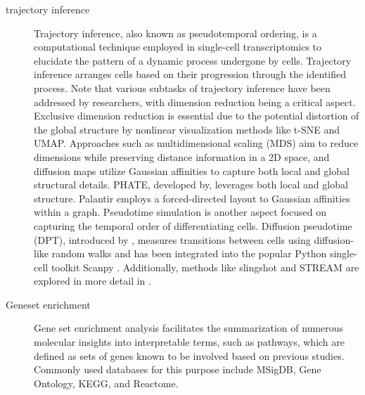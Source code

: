 \begin{description}
	\item[trajectory inference] 
	Trajectory inference, also known as pseudotemporal ordering, is a computational technique employed in single-cell transcriptomics to elucidate the pattern of a dynamic process undergone by cells. Trajectory inference arranges cells based on their progression through the identified process. Note that various subtasks of trajectory inference have been addressed by researchers, with dimension reduction being a critical aspect. Exclusive dimension reduction is essential due to the potential distortion of the global structure by nonlinear visualization methods like t-SNE and UMAP. Approaches such as multidimensional scaling (MDS) aim to reduce dimensions while preserving distance information in a 2D space, and diffusion maps utilize Gaussian affinities to capture both local and global structural details. PHATE, developed by\citep{moon2017phate}, leverages both local and global structure. Palantir employs a forced-directed layout to Gaussian affinities within a graph. Pseudotime simulation is another aspect focused on capturing the temporal order of differentiating cells. Diffusion pseudotime (DPT), introduced by \citep{haghverdi2016dpt}, measures transitions between cells using diffusion-like random walks and has been integrated into the popular Python single-cell toolkit Scanpy \citep{wolf2018scanpy}. Additionally, methods like slingshot\citep{street2018slingshot} and STREAM\citep{chen2019stream} are explored in more detail in .

	\item[Geneset enrichment] 
	Gene set enrichment analysis facilitates the summarization of numerous molecular insights into interpretable terms, such as pathways, which are defined as sets of genes known to be involved based on previous studies. Commonly used databases for this purpose include MSigDB, Gene Ontology, KEGG, and Reactome. 
\end{description}

